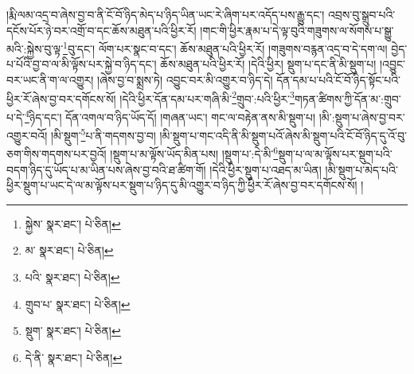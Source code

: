 །རྨི་ལམ་འདྲ་བ་ཞེས་བྱ་བ་ནི་ངོ་བོ་ཉིད་མེད་པ་ཉིད་ཡིན་ཡང་རེ་ཞིག་པར་འདོད་པས་རྒྱུ་དང་། འབྲས་བུ་སྒྲུབ་པའི་དངོས་པོར་ཉེ་བར་འགྲོ་བ་དང་ཆོས་མཐུན་པའི་ཕྱིར་རོ། །གང་གི་ཕྱིར་རྣམ་པ་དེ་ལྟ་བུའི་གཟུགས་ལ་སོགས་པ་སྒྱུ་མའི་:སྐྱེས་བུ་ལྟ་\footnote{སྐྱེས་  སྣར་ཐང་།  པེ་ཅིན། }བུ་དང་། ལོག་པར་སྣང་བ་དང་། ཆོས་མཐུན་པའི་ཕྱིར་རོ། །གཟུགས་བརྙན་འདྲ་བ་དེ་དག་ལ། བྱེད་པ་པོའི་བྱ་བ་ལ་མི་ལྟོས་པར་སྐྱེ་བ་ཉིད་དང་། ཆོས་མཐུན་པའི་ཕྱིར་རོ། །དེའི་ཕྱིར། སྡུག་པ་དང་ནི་མི་སྡུག་པ། །འབྱུང་བར་ཡང་ནི་ག་ལ་འགྱུར། །ཞེས་བྱ་བ་སྨྲས་ཏེ། འབྱུང་བར་མི་འགྱུར་བ་ཉིད་དེ། དོན་དམ་པ་པའི་ངོ་བོ་ཉིད་སྟོང་པའི་ཕྱིར་རོ་ཞེས་བྱ་བར་དགོངས་སོ། །དེའི་ཕྱིར་དོན་དམ་པར་གཞི་མི་\footnote{མ་  སྣར་ཐང་།  པེ་ཅིན། }གྲུབ་:པའི་ཕྱིར་\footnote{པའི་  སྣར་ཐང་།  པེ་ཅིན། }གཏན་ཚིགས་ཀྱི་དོན་མ་:གྲུབ་པ་དེ་\footnote{གྲུབ་པ་  སྣར་ཐང་།  པེ་ཅིན། }ཉིད་དང་། དོན་འགལ་བ་ཉིད་ཡོད་དོ། །གཞན་ཡང་། གང་ལ་བརྟེན་ནས་མི་སྡུག་པ། །མི་:སྡུག་པ་ཞེས་བྱ་བར་འགྱུར་བའོ། །མི་སྡུག་\footnote{སྡུག་  སྣར་ཐང་།  པེ་ཅིན། }པ་ནི་གདགས་བྱ་བ། །མི་སྡུག་པ་གང་འདི་ནི་མི་སྡུག་པའོ་ཞེས་མི་སྡུག་པའི་ངོ་བོ་ཉིད་དུ་འོ་བུ་ཅག་གིས་གདགས་པར་བྱའོ། །སྡུག་པ་མ་ལྟོས་ཡོད་མིན་པས། །སྡུག་པ་:དེ་མི་\footnote{དེ་ནི་  སྣར་ཐང་།  པེ་ཅིན། }སྡུག་པ་ལ་མ་ལྟོས་པར་སྡུག་པའི་བདག་ཉིད་དུ་ཡོད་པ་མ་ཡིན་པས་ཞེས་བྱ་བའི་ཐ་ཚིག་གོ། །དེའི་ཕྱིར་སྡུག་པ་འཐད་མ་ཡིན། །མི་སྡུག་པ་མེད་པའི་ཕྱིར་སྡུག་པ་ཡང་དེ་ལ་མ་ལྟོས་པར་སྡུག་པ་ཉིད་དུ་མི་འགྱུར་བ་ཉིད་ཀྱི་ཕྱིར་རོ་ཞེས་བྱ་བར་དགོངས་སོ། །
